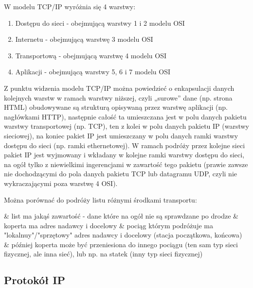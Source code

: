 
\noindent
W modelu TCP/IP wyróżnia się 4 warstwy:
\begin{enumerate}
	\item Dostępu do sieci - obejmującą warstwy 1 i 2 modelu OSI
	\item Internetu - obejmującą warstwę 3 modelu OSI
	\item Transportową - obejmującą warstwę 4 modelu OSI
	\item Aplikacji - obejmującą warstwy 5, 6 i 7 modelu OSI
\end{enumerate}

\noindent
Z punktu widzenia modelu TCP/IP można powiedzieć o enkapsulacji danych kolejnych warstw w ramach warstwy niższej, czyli „surowe” dane (np. strona HTML) obudowywane są strukturą opisywaną przez warstwę aplikacji (np. nagłówkami HTTP), następnie całość ta umieszczana jest w polu danych pakietu warstwy transportowej (np. TCP), ten z kolei w polu danych pakietu IP (warstwy sieciowej), na koniec pakiet IP jest umieszczany w polu danych ramki warstwy dostępu do sieci (np. ramki ethernetowej). W ramach podróży przez kolejne sieci pakiet IP jest wyjmowany i wkładany w kolejne ramki warstwy dostępu do sieci, na ogół tylko z niewielkimi ingerencjami w zawartość tego pakietu (prawie zawsze nie dochodzącymi do pola danych pakietu TCP lub datagramu UDP, czyli nie wykraczającymi poza warstwę 4 OSI).

\begin{teacherOnly} Można porównać do podróży listu różnymi środkami transportu:
	\begin{easylist}[itemize]
		& list ma jakąś zawartość - dane które na ogół nie są sprawdzane po drodze
		& koperta ma adres nadawcy i docelowy
		& pociąg którym podróżuje ma "lokalnuy"/"sprzętowy" adres nadawcy i docelowy (stacja początkowa, końcowa)
		& później koperta może być przeniesiona do innego pociągu (ten sam typ sieci fizycznej, ale inna sieć), lub np. na statek (inny typ sieci fizycznej)
	\end{easylist}
\end{teacherOnly}


\subsection{Protokół IP}

